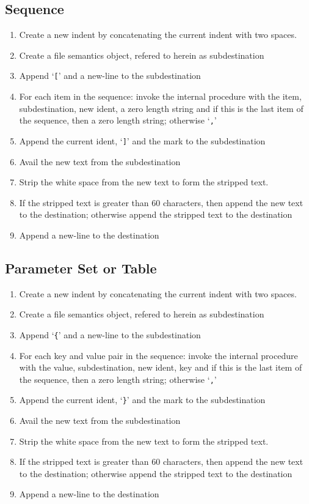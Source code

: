 \documentclass[12pt]{article}
\begin{document}
\subsection*{Sequence}
\begin{enumerate}
\item Create a new indent by concatenating the current indent with two spaces.
\item Create a file semantics object, refered to herein as subdestination
\item Append `\verb+[+' and a new-line to the subdestination
\item For each item in the sequence: invoke the internal procedure
      with the item, subdestination, new ident, a zero length string
      and if this is the last item of the sequence, then a zero length string;
      otherwise `\verb+,+'
\item Append the current ident, `\verb+]+' and the mark to the subdestination
\item Avail the new text from the subdestination
\item Strip the white space from the new text to form the stripped text.
\item If the stripped text is greater than 60 characters,
      then append the new text to the destination;
      otherwise append the stripped text to the destination
\item Append a new-line to the destination
\end{enumerate}
\subsection*{Parameter Set or Table}
\begin{enumerate}
\item Create a new indent by concatenating the current indent with two spaces.
\item Create a file semantics object, refered to herein as subdestination
\item Append `\verb+{+' and a new-line to the subdestination
\item For each key and value pair in the sequence: invoke the internal procedure
      with the value, subdestination, new ident, key
      and if this is the last item of the sequence, then a zero length string;
      otherwise `\verb+,+'
\item Append the current ident, `\verb+}+' and the mark to the subdestination
\item Avail the new text from the subdestination
\item Strip the white space from the new text to form the stripped text.
\item If the stripped text is greater than 60 characters,
      then append the new text to the destination;
      otherwise append the stripped text to the destination
\item Append a new-line to the destination
\end{enumerate}
\end{document}
